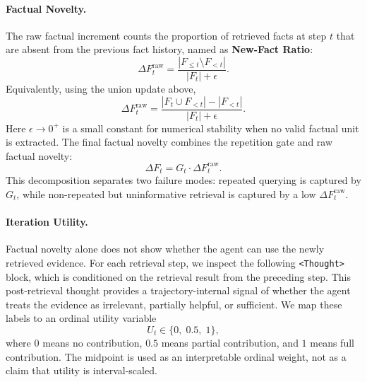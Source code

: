 \documentclass{article} %
\newcommand{\df}{\Delta F}
\newcommand{\facts}{F}
\begin{document}
\paragraph{Factual Novelty.}
The raw factual increment counts the proportion of retrieved facts at step $t$ that are absent from the previous fact history, named as \textbf{New-Fact Ratio}:
\begin{equation}
    \Delta F_t^{\mathrm{raw}}
    =
    \frac{|\facts_{\leq t} \setminus \facts_{<t}|}{|\facts_t|+\epsilon}.
\end{equation}
Equivalently, using the union update above,
\begin{equation}
    \Delta F_t^{\mathrm{raw}}
    =
    \frac{|\facts_t \cup \facts_{<t}| - |\facts_{<t}|}{|\facts_t|+\epsilon}.
    \label{eq:delta_f}
\end{equation}
Here $\epsilon\rightarrow0^+$ is a small constant for numerical stability when no valid factual unit is extracted.
The final factual novelty combines the repetition gate and raw factual novelty:
\begin{equation}
    \df_t = G_t \cdot \Delta F_t^{\mathrm{raw}}.
    \label{eq:delta_f_whole}
\end{equation}
This decomposition separates two failure modes: repeated querying is captured by $G_t$, while non-repeated but uninformative retrieval is captured by a low $\Delta F_t^{\mathrm{raw}}$.

\paragraph{Iteration Utility.}
Factual novelty alone does not show whether the agent can use the newly retrieved evidence.
For each retrieval step, we inspect the following \texttt{<Thought>} block, which is conditioned on the retrieval result from the preceding step.
This post-retrieval thought provides a trajectory-internal signal of whether the agent treats the evidence as irrelevant, partially helpful, or sufficient.
We map these labels to an ordinal utility variable
\begin{equation}
    U_t \in \{0,\;0.5,\;1\},
    \label{eq:u_t}
\end{equation}
where $0$ means no contribution, $0.5$ means partial contribution, and $1$ means full contribution.
The midpoint is used as an interpretable ordinal weight, not as a claim that utility is interval-scaled.
\end{document}
